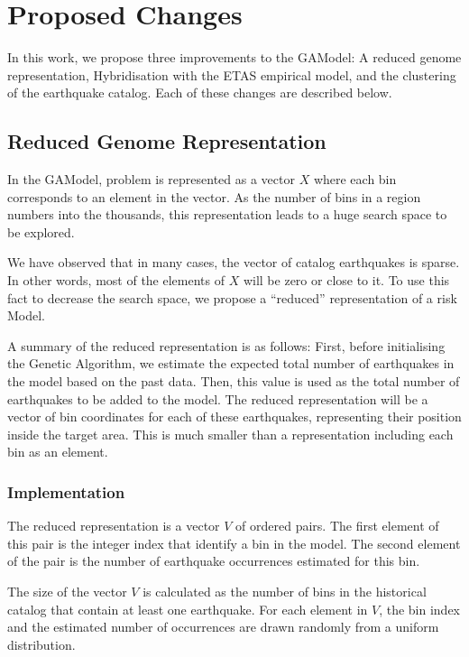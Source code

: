 \section{Proposed Changes}
\label{sec:adaptations}

In this work, we propose three improvements to the GAModel: A reduced
genome representation, Hybridisation with the ETAS empirical model,
and the clustering of the earthquake catalog. Each of these changes
are described below.

\subsection{Reduced Genome Representation}

In the GAModel, problem is represented as a vector $X$ where each bin
corresponds to an element in the vector. As the number of bins in a
region numbers into the thousands, this representation leads to a huge
search space to be explored.

We have observed that in many cases, the vector of catalog
earthquakes is sparse. In other words, most of the elements of $X$
will be zero or close to it. To use this fact to decrease the
search space, we propose a ``reduced'' representation of a risk Model.

A summary of the reduced representation is as follows: First, before
initialising the Genetic Algorithm, we estimate the expected total
number of earthquakes in the model based on the past data. Then, this
value is used as the total number of earthquakes to be added to the
model. The reduced representation will be a vector of bin coordinates
for each of these earthquakes, representing their position inside the
target area. This is much smaller than a representation including each
bin as an element.


\subsubsection*{Implementation}

The reduced representation is a vector $V$ of ordered pairs. The first
element of this pair is the integer index that identify a bin in the
model. The second element of the pair is the number of earthquake
occurrences estimated for this bin.

The size of the vector $V$ is calculated as the number of bins in the
historical catalog that contain at least one earthquake. For each
element in $V$, the bin index and the estimated number of occurrences
are drawn randomly from a uniform distribution.

